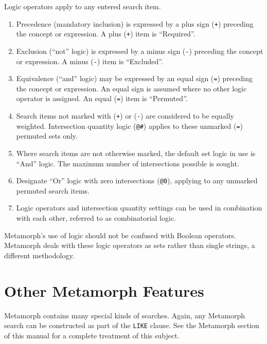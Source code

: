 Logic operators apply to any entered search item.

\begin{enumerate}
\item Precedence (mandatory inclusion) is expressed by a plus sign
(\verb`+`) preceding the concept or expression.  A plus (\verb`+`)
item is ``Required''.

\item Exclusion (``not'' logic) is expressed by a minus sign
(\verb`-`) preceding the concept or expression.  A minus (\verb`-`)
item is ``Excluded''.

\item Equivalence (``and'' logic) may be expressed by an equal sign
(\verb`=`) preceding the concept or expression.  An equal sign is
assumed where no other logic operator is assigned.  An equal
(\verb`=`) item is ``Permuted''.

\item Search items not marked with (\verb`+`) or (\verb`-`) are
considered to be equally weighted.  Intersection quantity logic
(\verb`@#`) applies to these unmarked (\verb`=`) permuted sets only.

\item Where search items are not otherwise marked, the default set
logic in use is ``And'' logic.  The maximum number of intersections
possible is sought.

\item Designate ``Or'' logic with zero intersections (\verb`@0`),
applying to any unmarked permuted search items.

\item Logic operators and intersection quantity settings can be used
in combination with each other, referred to as combinatorial logic.
\end{enumerate}

Metamorph's use of logic should not be confused with Boolean
operators.  Metamorph deals with these logic operators as sets rather
than single strings, a different methodology.

\section{Other Metamorph Features}

Metamorph contains many special kinds of searches.  Again, any
Metamorph search can be constructed as part of the \verb`LIKE` clause.
See the Metamorph section of this manual for a complete treatment
of this subject.
